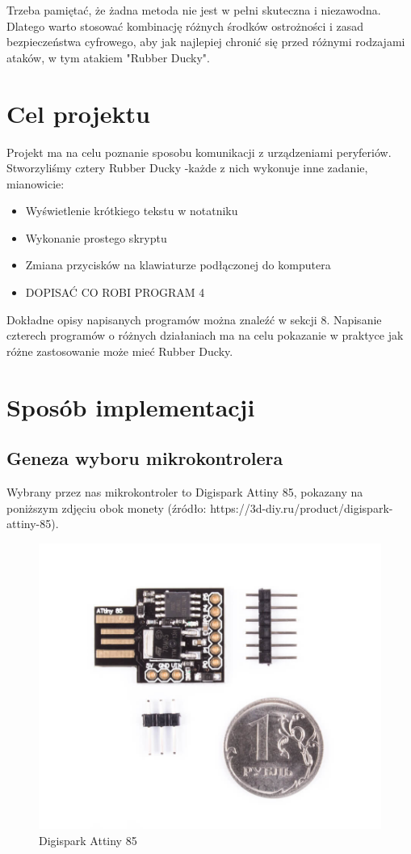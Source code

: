 \documentclass{article}
\begin{document}
Trzeba pamiętać, że żadna metoda nie jest w pełni skuteczna i niezawodna. Dlatego warto stosować kombinację różnych środków ostrożności i zasad bezpieczeństwa cyfrowego, aby jak najlepiej chronić się przed różnymi rodzajami ataków, w tym atakiem "Rubber Ducky".

\section{Cel projektu}
Projekt ma na celu poznanie sposobu komunikacji z urządzeniami peryferiów. Stworzyliśmy cztery Rubber Ducky -każde z nich wykonuje inne zadanie, mianowicie:
\begin{itemize}
    \item Wyświetlenie krótkiego tekstu w notatniku
    \item Wykonanie prostego skryptu
    \item Zmiana przycisków na klawiaturze podłączonej do komputera
    \item DOPISAĆ CO ROBI PROGRAM 4
\end{itemize}
Dokładne opisy napisanych programów można znaleźć w sekcji 8. Napisanie czterech programów o różnych działaniach ma na celu pokazanie w praktyce jak różne zastosowanie może mieć Rubber Ducky.

\section{Sposób implementacji}
\subsection{Geneza wyboru mikrokontrolera}
Wybrany przez nas mikrokontroler to Digispark Attiny 85, pokazany na poniższym zdjęciu obok monety (źródło: https://3d-diy.ru/product/digispark-attiny-85).

\begin{figure}[h]
    \centering
    \includegraphics[scale=0.2]{Digispark.jpg}
    \caption{Digispark Attiny 85}
    \label{fig:enter-label}
\end{figure}
\end{document}
